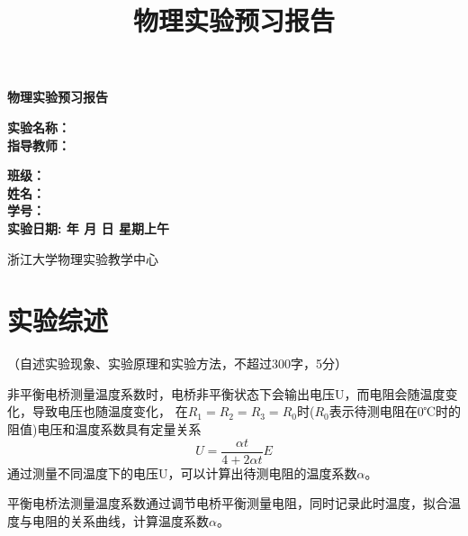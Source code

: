 \documentclass[10pt,a4paper]{ctexart}
\title{\xiaochu\textbf{物理实验预习报告}}
\author{}
\date{}
\newcommand{\myspace}[1]{\par\vspace{#1\baselineskip}} %
\newcommand{\xiaochu}{\fontsize{36pt}{42pt}\selectfont}
\newcommand{\sanhao}{\fontsize{16pt}{20pt}\selectfont}
\newcommand{\sihao}{\fontsize{14pt}{18pt}\selectfont}
\newcommand{\xiaosi}{\fontsize{12pt}{16pt}\selectfont}
\begin{document}
\vspace*{36pt} %

\begin{center}   
    \xiaochu\textbf{物理实验预习报告}
    \vspace{13pt}
    \vspace{13pt}
    \vspace{13pt}
    \vspace{13pt}
    
    \sanhao\textbf{实验名称：\underline{}} \\[10pt]
    \sanhao\textbf{指导教师：\underline{}} \\[30pt]
    
    \myspace{6}
    
   \sihao\textbf{班级：\underline{\makebox[6cm]{}}} \\[10pt]
    \sihao\textbf{姓名：\underline{\makebox[6cm]{}}} \\[10pt]
    \sihao\textbf{学号：\underline{\makebox[6cm]{}}} \\[30pt]
    
   \sihao\textbf{实验日期: 
   \underline{}  年 
   \underline{}月
   \underline{}日  
   星期\underline{}上午}
    
    \vspace{18pt}
    \sihao 浙江大学物理实验教学中心
    
\end{center}

\newpage

    \section{实验综述}
    
    \xiaosi （自述实验现象、实验原理和实验方法，不超过300字，5分）

    非平衡电桥测量温度系数时，电桥非平衡状态下会输出电压U，而电阻会随温度变化，导致电压也随温度变化，
    在$R_1=R_2=R_3=R_0$时($R_0$表示待测电阻在0℃时的阻值)电压和温度系数具有定量关系
    \[
        U=\frac{\alpha t}{4+2 \alpha t}E
    \]
    通过测量不同温度下的电压U，可以计算出待测电阻的温度系数$\alpha$。

    平衡电桥法测量温度系数通过调节电桥平衡测量电阻，同时记录此时温度，拟合温度与电阻的关系曲线，计算温度系数$\alpha$。

\myspace{2}
    
\end{document}
